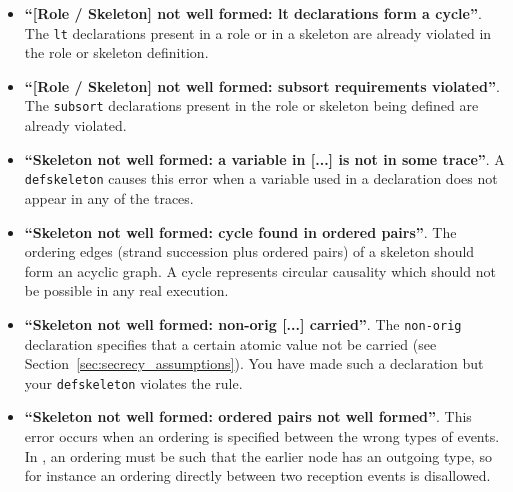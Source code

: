 \begin{itemize}
\item \textbf{``[Role / Skeleton] not well formed: lt declarations
    form a cycle''}.  The \texttt{lt} declarations present in a role
  or in a skeleton are already violated in the role or skeleton
  definition.

\item \textbf{``[Role / Skeleton] not well formed: subsort
    requirements violated''}.  The \texttt{subsort} declarations
  present in the role or skeleton being defined are already violated.

\item \textbf{``Skeleton not well formed: a variable in [...] is not in some trace''}.
  A \texttt{defskeleton} causes this error when a variable used in a declaration
  does not appear in any of the traces.

\item \textbf{``Skeleton not well formed: cycle found in ordered pairs''}.
  The ordering edges (strand succession plus ordered pairs) of a skeleton should form
  an acyclic graph.  A cycle represents circular causality which should not be possible in
  any real execution.

\item \textbf{``Skeleton not well formed: non-orig [...] carried''}.  The \texttt{non-orig}
  declaration specifies that a certain atomic value not be carried
  (see Section~\ref{sec:secrecy_assumptions}).  You have made such a declaration but your
  \texttt{defskeleton} violates the rule.

\item \textbf{``Skeleton not well formed: ordered pairs not well formed''}.
  This error occurs when an ordering is specified between the wrong types of events.
  In {\cpsa}, an ordering must be such that the earlier node has an outgoing type, so
  for instance an ordering directly between two reception events is disallowed.



\end{itemize}
